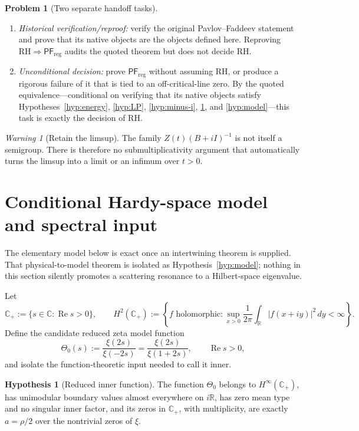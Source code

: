 \documentclass[11pt]{amsart}
\theoremstyle{definition}
\newtheorem{problem}[theorem]{Problem}
\newtheorem{hypothesis}[theorem]{Hypothesis}
\theoremstyle{remark}
\newtheorem{warning}[theorem]{Warning}
\DeclareMathOperator{\Repart}{Re}
\newcommand{\C}{\mathbb C}
\newcommand{\R}{\mathbb R}
\begin{document}
\begin{problem}[Two separate handoff tasks]\label{prob:two-tasks}
\leavevmode
\begin{enumerate}[label=(T\arabic*)]
 \item \emph{Historical verification/reproof:} verify the original
       Pavlov--Faddeev statement and prove that its native objects are the
       objects defined here.  Reproving
       $\mathrm{RH}\Rightarrow\mathsf{PF}_{\mathrm{reg}}$ audits the quoted
       theorem but does not decide RH.
 \item \emph{Unconditional decision:} prove
       $\mathsf{PF}_{\mathrm{reg}}$ without assuming RH, or produce a rigorous
       failure of it that is tied to an off-critical-line zero.  By the quoted
       equivalence---conditional on verifying that its native objects satisfy
       Hypotheses~\ref{hyp:energy}, \ref{hyp:LP}, \ref{hyp:minus-i},
       \ref{hyp:inner}, and \ref{hyp:model}---this task is exactly the decision
       of RH.
\end{enumerate}
\end{problem}

\begin{warning}[Retain the limsup]
The family $Z(t)(B+iI)^{-1}$ is not itself a semigroup.  There is therefore no
submultiplicativity argument that automatically turns the limsup into a limit
or an infimum over $t>0$.
\end{warning}

\section{Conditional Hardy-space model and spectral input}\label{sec:model}

The elementary model below is exact once an intertwining theorem is supplied.
That physical-to-model theorem is isolated as Hypothesis~\ref{hyp:model};
nothing in this section silently promotes a scattering resonance to a
Hilbert-space eigenvalue.

Let
\[
 \C_{+}:=\{s\in\C:\Repart s>0\},
 \qquad
 H^{2}(\C_{+})
 :=\left\{f\text{ holomorphic}:
 \sup_{x>0}\frac1{2\pi}\int_{\R}|f(x+iy)|^{2}\,dy<\infty\right\}.
\]
Define the candidate reduced zeta model function
\[
 \Theta_{0}(s):=\frac{\xi(2s)}{\xi(-2s)}
               =\frac{\xi(2s)}{\xi(1+2s)},
 \qquad \Repart s>0,
\]
and isolate the function-theoretic input needed to call it inner.

\begin{hypothesis}[Reduced inner function]\label{hyp:inner}
The function $\Theta_{0}$ belongs to $H^{\infty}(\C_{+})$, has unimodular
boundary values almost everywhere on $i\R$, has zero mean type and no singular
inner factor, and its zeros in $\C_{+}$, with multiplicity, are exactly
$a=\rho/2$ over the nontrivial zeros of $\xi$.
\end{hypothesis}
\end{document}
